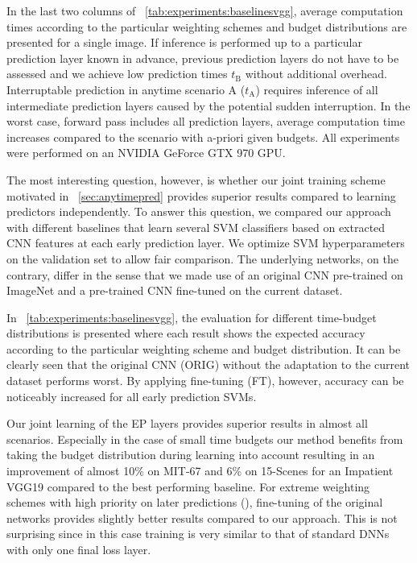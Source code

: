 \documentclass{bmvc2k}
\begin{document}
    In the last two columns of \tablename~\ref{tab:experiments:baselinesvgg}, average computation times according to the particular weighting schemes and budget distributions are presented for a single image.
    If inference is performed up to a particular prediction layer known in advance, previous prediction layers do not have to be assessed
    and we achieve low prediction times $t_{\text{B}}$ without additional overhead.
    Interruptable prediction in anytime scenario A ($t_{\text{A}}$) requires inference of all intermediate prediction layers caused by the potential sudden interruption.
    In the worst case, \ie\the forward pass includes all prediction layers, average computation time increases compared to the
    scenario with a-priori given budgets.
    All experiments were performed on an NVIDIA GeForce GTX 970 GPU.

    The most interesting question, however, is whether our joint training scheme motivated in \sectionname~\ref{sec:anytimepred}
    provides superior results compared to learning predictors independently.
    To answer this question, we compared our approach with different baselines that learn several SVM classifiers based on extracted CNN features \cite{donahue2013decaf} at each early prediction layer.
    We optimize SVM hyperparameters on the validation set to allow fair comparison.
    The underlying networks, on the contrary, differ in the sense that we made use of an original CNN pre-trained on ImageNet and a pre-trained CNN fine-tuned on the current dataset.

    In \tablename~\ref{tab:experiments:baselinesvgg}, the evaluation for different time-budget distributions is presented where each result shows the expected
    accuracy according to the particular weighting scheme and budget distribution.
    It can be clearly seen that the original CNN (ORIG) without the adaptation to the current dataset performs worst.
    By applying fine-tuning (FT), however, accuracy can be noticeably increased for all early prediction SVMs.

    Our joint learning of the EP layers provides superior results in almost all scenarios.
    Especially in the case of small time budgets our method benefits from taking the budget distribution during learning into account
    resulting in an improvement of almost 10\% on MIT-67 and 6\% on 15-Scenes for an Impatient VGG19 compared to the best performing baseline.
    For extreme weighting schemes with high priority on later predictions (), fine-tuning of the original networks provides slightly better results compared to our approach.
    This is not surprising since in this case training is very similar to that of standard DNNs with only one final loss layer.
\end{document}
